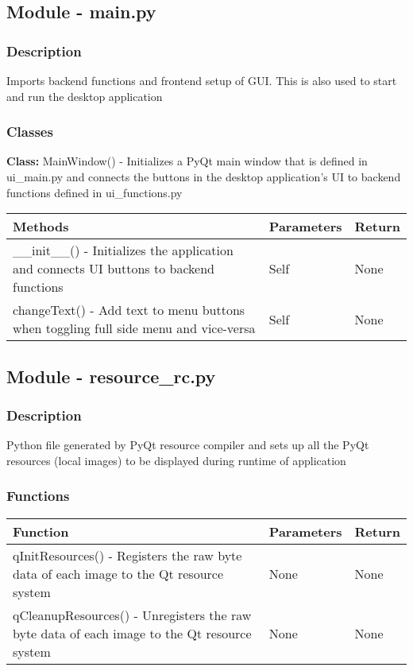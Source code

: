 \documentclass[12pt, titlepage]{article}
\begin{document}
  \subsection{Module - main.py}

  \subsubsection{Description}
  Imports backend functions and frontend setup of GUI. This is also used to start and run the desktop application

  \subsubsection{Classes}
  \textbf{Class:} MainWindow() - Initializes a PyQt main window that is defined in ui\_main.py and connects the buttons in the desktop application’s UI to backend functions defined in ui\_functions.py \\

    \noindent \begin{tabular}{| p{} | p{}| p{}|}
      \hline
      \rowcolor[gray]{0.9}
      Methods & Parameters & Return\\
      \hline
      \_\_init\_\_() - Initializes the application and connects UI buttons to backend functions &  Self & None \\
      \hline
      changeText() - Add text to menu buttons when toggling full side menu and vice-versa & Self & None \\
      \hline
    \end{tabular}

  \subsection{Module - resource\_rc.py}

  \subsubsection{Description}
  Python file generated by PyQt resource compiler and sets up all the PyQt resources (local images) to be displayed during runtime of application
  

  \subsubsection{Functions}
  
    \noindent \begin{tabular}{| p{} | p{}| p{}|}
      \hline
      \rowcolor[gray]{0.9}
      Function & Parameters & Return\\
      \hline
      qInitResources() - Registers the raw byte data of each image to the Qt resource system &  None & None \\
      \hline
      qCleanupResources() - Unregisters the raw byte data of each image to the Qt resource system & None & None \\
      \hline
    \end{tabular}
\end{document}
